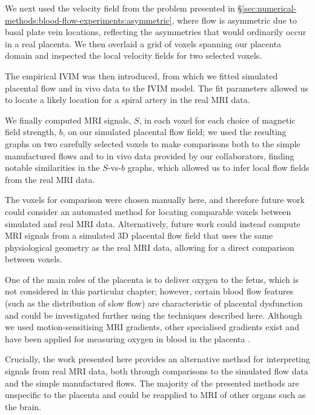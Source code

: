         We next used the velocity field from the problem presented in \S\ref{sec:numerical-methods:blood-flow-experiments:asymmetric}, where flow is asymmetric due to basal plate vein locations, reflecting the asymmetries that would ordinarily occur in a real placenta. We then overlaid a grid of voxels spanning our placenta domain and inspected the local velocity fields for two selected voxels.
        
        The empirical IVIM \cite{lebihanWhatCanWe2019} was then introduced, from which we fitted simulated placental flow and in vivo data to the IVIM model. The fit parameters allowed us to locate a likely location for a spiral artery in the real MRI data.

        We finally computed MRI signals, $S$, in each voxel for each choice of magnetic field strength, $b$, on our simulated placental flow field; we used the resulting graphs on two carefully selected voxels to make comparisons both to the simple manufactured flows and to in vivo data provided by our collaborators, finding notable similarities in the $S$-vs-$b$ graphs, which allowed us to infer local flow fields from the real MRI data.
        
        The voxels for comparison were chosen manually here, and therefore future work could consider an automated method for locating comparable voxels between simulated and real MRI data. Alternatively, future work could instead compute MRI signals from a simulated 3D placental flow field that uses the same physiological geometry as the real MRI data, allowing for a direct comparison between voxels.

        One of the main roles of the placenta is to deliver oxygen to the fetus, which is not considered in this particular chapter; however, certain blood flow features (such as the distribution of slow flow) are characteristic of placental dysfunction and could be investigated further using the techniques described here. Although we used motion-sensitising MRI gradients, other specialised gradients exist and have been applied for measuring oxygen in blood in the placenta \cite{dellschaftHaemodynamicsHumanPlacenta2020}.
        
        Crucially, the work presented here provides an alternative method for interpreting signals from real MRI data, both through comparisons to the simulated flow data and the simple manufactured flows. The majority of the presented methods are unspecific to the placenta and could be reapplied to MRI of other organs such as the brain.